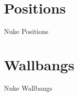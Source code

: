 \section{Positions}
\label{sect:nuke_positions}
Nuke Positions

\section{Wallbangs}
\label{sect:nuke_wallbangs}
Nuke Wallbangs
